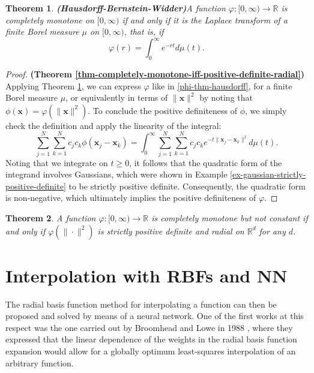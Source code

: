 \documentclass[12pt]{report} %
\newtheorem{theorem}{Theorem}
\newcommand{\tmmathbf}[1]{\ensuremath{\boldsymbol{#1}}}
\newcommand{\tmstrong}[1]{\textbf{#1}}
\begin{document}
\begin{theorem}
  {\tmstrong{(Hausdorff-Bernstein-Widder)}}\label{thm-hausdorff-bernstein-widder}
  A function $\varphi : [0, \infty) \rightarrow \mathbb{R}$ is completely
  monotone on $[0, \infty)$ if and only if it is the Laplace transform of a
  finite  Borel measure $\mu$ on $[0, \infty)$, that is, if
  \begin{equation}
    \varphi (r) = \int_0^{\infty} e^{- r t} d \mu (t) .
    \label{phi-thm-hausdorff}
  \end{equation}
\end{theorem}

\begin{proof}
  {\tmstrong{(Theorem
  \ref{thm-completely-monotone-iff-positive-definite-radial})}} Applying
  Theorem \ref{thm-hausdorff-bernstein-widder}, we can express $\varphi$ like
  in \eqref{phi-thm-hausdorff}, for a finite Borel measure $\mu$,
  or equivalently in terms of $\| \tmmathbf{x} \|^2$ by noting that $\phi
  (\tmmathbf{x}) = \varphi (\| \tmmathbf{x} \|^2)$. To conclude the positive
  definiteness of $\phi$, we simply check the definition and apply the
  linearity of the integral:
  \[ \sum_{j = 1}^N \sum_{k = 1}^N c_j c_k \phi (\tmmathbf{x}_j
     -\tmmathbf{x}_k) = \int_0^{\infty} \sum_{j = 1}^N \sum_{k = 1}^N c_j c_k
     e^{- t \| \tmmathbf{x}_j -\tmmathbf{x}_k \|^2} d \mu (t) . \]
  Noting that we integrate on $t \geq 0$, it follows that the quadratic form of
  the integrand involves Gaussians, which were shown in Example
  \ref{ex-gaussian-strictly-positive-definite} to be strictly positive
  definite. Consequently, the quadratic form is non-negative, which ultimately
  implies the positive definiteness of $\varphi$.
\end{proof}

\begin{theorem}
  A function $\varphi : [0, \infty) \rightarrow \mathbb{R}$ is completely
  monotone but not constant if and only if $\varphi (\| \cdot \|^2)$ is
  strictly positive definite and radial on $\mathbb{R}^d$ for any $d$.
  {}
\end{theorem}

\section{Interpolation with RBFs and NN}


The radial basis function method for interpolating a function can then be
proposed and solved by means of a neural network. One of the first works at
this respect was the one carried out by Broomhead and Lowe in 1988
{\cite{broomhead1988multivariable}}, where they expressed that the linear
dependence of the weights in the radial basis function expansion would allow
for a globally optimum least-squares interpolation of an arbitrary function.
\end{document}
